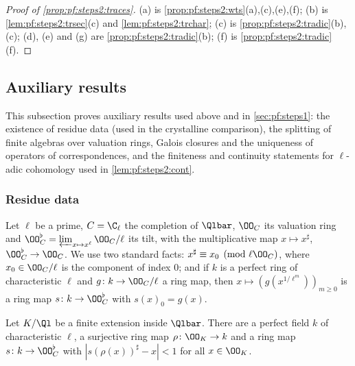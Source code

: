 \begin{proof}[Proof of \cref{prop:pf:steps2:traces}]
(a) is \cref{prop:pf:steps2:wts}(a),(c),(e),(f); (b) is \cref{lem:pf:steps2:trsec}(c) and
\cref{lem:pf:steps2:trchar}; (c) is \cref{prop:pf:steps2:tradic}(b),(c); (d), (e) and (g) are
\cref{prop:pf:steps2:tradic}(b); (f) is \cref{prop:pf:steps2:tradic}(f).
\end{proof}

\subsection{Auxiliary results}\label{sec:pf:steps2:aux}

This subsection proves auxiliary results used above and in \cref{sec:pf:steps1}: the existence of
residue data (used in the crystalline comparison), the splitting of finite algebras over valuation
rings, Galois closures and the uniqueness of operators of correspondences, and the finiteness and
continuity statements for $\ell$-adic cohomology used in \cref{lem:pf:steps2:cont}.

\subsubsection{Residue data}

Let $\ell$ be a prime, $C=\C_\ell$ the completion of $\Qlbar$, $\OO_C$ its valuation ring and
$\OO_C^\flat=\varprojlim_{x\mapsto x^\ell}\OO_C/\ell$ its tilt, with the multiplicative map
$x\mapsto x^\sharp$, $\OO_C^\flat\to\OO_C$. We use two standard facts: $x^\sharp\equiv x_0\pmod{\ell\OO_C}$,
where $x_0\in\OO_C/\ell$ is the component of index $0$; and if $k$ is a perfect ring of characteristic
$\ell$ and $g\colon k\to\OO_C/\ell$ a ring map, then $x\mapsto(g(x^{1/\ell^m}))_{m\ge0}$ is a ring map
$s\colon k\to\OO_C^\flat$ with $s(x)_0=g(x)$.

\begin{lemma}\label{lem:pf:steps2:resdata}
Let $K/\Ql$ be a finite extension inside $\Qlbar$. There are a perfect field $k$ of characteristic
$\ell$, a surjective ring map $\rho\colon\OO_K\to k$ and a ring map $s\colon k\to\OO_C^\flat$ with
$|s(\rho(x))^\sharp-x|<1$ for all $x\in\OO_K$.
\end{lemma}

